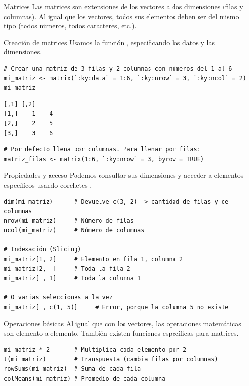 \documentclass[8pt]{beamer}
\begin{document}
\begin{frame}[fragile]{Matrices}
	Las matrices son extensiones de los vectores a dos dimensiones (filas y columnas). Al igual que los vectores, todos sus elementos deben ser del mismo tipo (todos números, todos caracteres, etc.).
\end{frame}


\begin{frame}[fragile]{Creación de matrices}
Usamos la función , especificando los datos y las dimensiones.
\begin{lstlisting}[style=RScript]
# Crear una matriz de 3 filas y 2 columnas con números del 1 al 6
mi_matriz <- matrix(`:ky:data` = 1:6, `:ky:nrow` = 3, `:ky:ncol` = 2)
mi_matriz
\end{lstlisting}
\begin{lstlisting}[style=RConsole]
     [,1] [,2]
[1,]    1    4
[2,]    2    5
[3,]    3    6	
\end{lstlisting}
\begin{lstlisting}[style=RScript]
# Por defecto llena por columnas. Para llenar por filas:
matriz_filas <- matrix(1:6, `:ky:nrow` = 3, byrow = TRUE)	
\end{lstlisting}
\end{frame}





\begin{frame}[fragile]{Propiedades y acceso}
	Podemos consultar sus dimensiones y acceder a elementos específicos usando corchetes .
\begin{lstlisting}[style=RScript]
dim(mi_matriz)      # Devuelve c(3, 2) -> cantidad de filas y de columnas
nrow(mi_matriz)     # Número de filas
ncol(mi_matriz)     # Número de columnas

# Indexación (Slicing)
mi_matriz[1, 2]     # Elemento en fila 1, columna 2
mi_matriz[2,  ]     # Toda la fila 2
mi_matriz[ , 1]     # Toda la columna 1

# O varias selecciones a la vez
mi_matriz[ , c(1, 5)]     # Error, porque la columna 5 no existe
\end{lstlisting}
\end{frame}



\begin{frame}[fragile]{Operaciones básicas}
	Al igual que con los vectores, las operaciones matemáticas son elemento a elemento. También existen funciones específicas para matrices.
\begin{lstlisting}[style=RScript]
mi_matriz * 2       # Multiplica cada elemento por 2
t(mi_matriz)        # Transpuesta (cambia filas por columnas)
rowSums(mi_matriz)  # Suma de cada fila
colMeans(mi_matriz) # Promedio de cada columna	
\end{lstlisting}
\end{frame}
\end{document}
